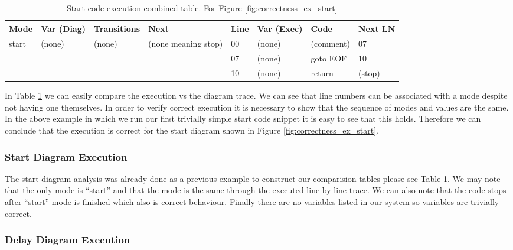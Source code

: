 \begin{table}[htcb]
	\caption{Start code execution combined table. For Figure \ref{fig:correctness_ex_start}}
	\centering
	\tablefontsize
		\begin{tabular}{| p{} | p{} | p{} | p{} | p{} | p{} | p{} | p{} |}
			\hline
			\textbf{Mode} 		&	\textbf{Var (Diag)} 		& 	\textbf{Transitions} 		& 	\textbf{Next}		&	\textbf{Line}		&	\textbf{Var (Exec)	}	&	\textbf{Code}	&	\textbf{Next LN} \\
			\hline
			start 				&	(none)						&	(none)						&	(none meaning stop)	&	00					&	(none)					& 	(comment)		&	07 \\
			\hline
								&								&								&						&	07					& 	(none)					& 	goto EOF		& 	10 \\
			\hline
								&								&								&						&	10					&	(none)					&	return			&	(stop) \\
			\hline
		\end{tabular}
	\label{table:BasicExecCombined}
\end{table}

In Table \ref{table:BasicExecCombined} we can easily 
compare the execution vs the diagram trace. 
We can see that line numbers can be associated with 
a mode despite not having one themselves. 
In order to verify correct execution it is necessary to 
show that the sequence of modes and values are the same. 
In the above example in which we run our first trivially 
simple start code snippet it is easy to see that this holds. 
Therefore we can conclude that the execution is 
correct for the start diagram shown in Figure \ref{fig:correctness_ex_start}.

\subsubsection{Start Diagram Execution}

The start diagram analysis was already done as a previous example to 
construct our comparision tables please see Table \ref{table:BasicExecCombined}. 
We may note that the only mode is ``start'' and that the mode is the same 
through the executed line by line trace. We can also note that the code stops after ``start'' 
mode is finished which also is correct behaviour. 
Finally there are no variables listed in
our system so variables are trivially correct.

\subsubsection{Delay Diagram Execution}

